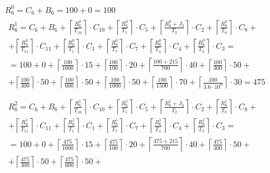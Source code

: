 \begin{gather*}
  R_6^0 = C_6 + B_6 = 100 + 0 = 100 \\
  \begin{multlined}
    R_6^1 = C_6 + B_6 + \left\lceil\frac{R_6^0}{T_{10}}\right\rceil\cdot C_{10} + %
    \left\lceil\frac{R_6^0}{T_5}\right\rceil\cdot C_5 + %
    \left\lceil\frac{R_6^0 + J_2}{T_2}\right\rceil\cdot C_2 + %
    \left\lceil\frac{R_6^0}{T_8}\right\rceil\cdot C_8 + \\%
    + \left\lceil\frac{R_6^0}{T_{11}}\right\rceil\cdot C_{11} + %
    \left\lceil\frac{R_6^0}{T_1}\right\rceil\cdot C_1 +%
    \left\lceil\frac{R_6^0}{T_7}\right\rceil\cdot C_7 +%
    \left\lceil\frac{R_6^0}{T_4}\right\rceil\cdot C_4 +%
    \left\lceil\frac{R_6^0}{T_3}\right\rceil\cdot C_3 = \\%
    = 100 + 0 + \left\lceil\frac{100}{1000}\right\rceil\cdot 15 + %
    \left\lceil\frac{100}{100}\right\rceil\cdot 20 + %
    \left\lceil\frac{100 + 215}{700}\right\rceil\cdot 40 + %
    \left\lceil\frac{100}{300}\right\rceil\cdot 50 + \\%
    + \left\lceil\frac{100}{300}\right\rceil\cdot 50 + %
    \left\lceil\frac{100}{600}\right\rceil\cdot 50 + %
    \left\lceil\frac{100}{1000}\right\rceil\cdot 50 +%
    \left\lceil\frac{100}{1500}\right\rceil\cdot 70 +%
    \left\lceil\frac{100}{3.6 \cdot 10^6}\right\rceil\cdot 30 = 475 \\
  \end{multlined} \\
  \begin{multlined}
    R_6^2 = C_6 + B_6 + \left\lceil\frac{R_6^1}{T_{10}}\right\rceil\cdot C_{10} + %
    \left\lceil\frac{R_6^1}{T_5}\right\rceil\cdot C_5 + %
    \left\lceil\frac{R_6^1 + J_2}{T_2}\right\rceil\cdot C_2 + %
    \left\lceil\frac{R_6^1}{T_8}\right\rceil\cdot C_8 + \\%
    + \left\lceil\frac{R_6^1}{T_{11}}\right\rceil\cdot C_{11} + %
    \left\lceil\frac{R_6^1}{T_1}\right\rceil\cdot C_1 +%
    \left\lceil\frac{R_6^1}{T_7}\right\rceil\cdot C_7 +%
    \left\lceil\frac{R_6^1}{T_4}\right\rceil\cdot C_4 +%
    \left\lceil\frac{R_6^1}{T_3}\right\rceil\cdot C_3 = \\%
    = 100 + 0 + \left\lceil\frac{475}{1000}\right\rceil\cdot 15 + %
    \left\lceil\frac{475}{100}\right\rceil\cdot 20 + %
    \left\lceil\frac{475 + 215}{700}\right\rceil\cdot 40 + %
    \left\lceil\frac{475}{300}\right\rceil\cdot 50 + \\%
    + \left\lceil\frac{475}{300}\right\rceil\cdot 50 + %
    \left\lceil\frac{475}{600}\right\rceil\cdot 50 + %

\end{multlined}
\end{gather*}
